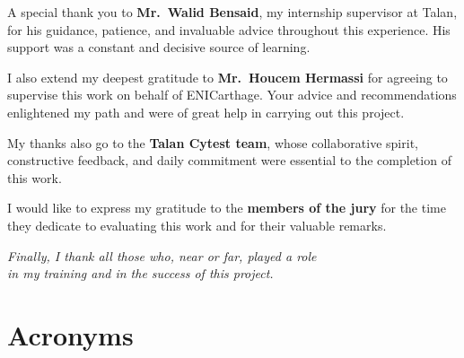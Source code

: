 \documentclass[12pt,a4paper]{report}
\begin{document}
\vspace{0.9cm}

A special thank you to \textbf{Mr.\ Walid Bensaid}, my internship supervisor at Talan,
for his guidance, patience, and invaluable advice throughout this experience.
His support was a constant and decisive source of learning.

\vspace{0.9cm}

I also extend my deepest gratitude to \textbf{Mr.\ Houcem Hermassi} for agreeing
to supervise this work on behalf of ENICarthage. Your advice and recommendations
enlightened my path and were of great help in carrying out this project.

\vspace{0.9cm}

My thanks also go to the \textbf{Talan Cytest team}, whose collaborative spirit,
constructive feedback, and daily commitment were essential to the completion
of this work.

\vspace{0.9cm}

I would like to express my gratitude to the \textbf{members of the jury} for the time
they dedicate to evaluating this work and for their valuable remarks.

\vspace{1.1cm}

\begin{flushright}
\itshape
Finally, I thank all those who, near or far, played a role\\
in my training and in the success of this project.
\end{flushright}

\newpage
\renewcommand{\contentsname}{Table of Contents}
\tableofcontents

\newpage
\renewcommand{\listfigurename}{List of Figures}
\listoffigures

\newpage
\renewcommand{\listtablename}{List of Tables}
\listoftables

\newpage
\thispagestyle{fancy}
\section*{Acronyms}
\end{document}
